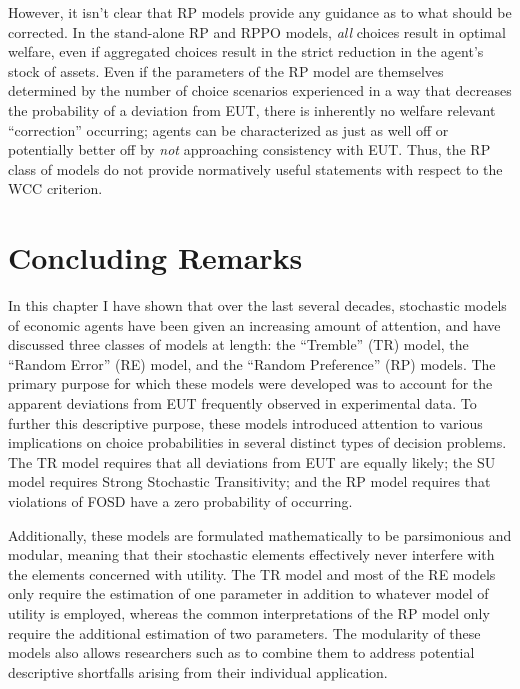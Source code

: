 \documentclass[../main.tex]{subfiles}
\begin{document}
However, it isn't clear that RP models provide any guidance as to what should be corrected.
In the stand-alone RP and RPPO models, \textit{all} choices result in optimal welfare, even if aggregated choices result in the strict reduction in the agent's stock of assets.
Even if the parameters of the RP model are themselves determined by the number of choice scenarios experienced in a way that decreases the probability of a deviation from EUT, there is inherently no welfare relevant \enquote{correction} occurring;
agents can be characterized as just as well off or potentially better off by \textit{not} approaching consistency with EUT.
Thus, the RP class of models do not provide normatively useful statements with respect to the WCC criterion.

\section{Concluding Remarks}

In this chapter I have shown that over the last several decades, stochastic models of economic agents have been given an increasing amount of attention, and have discussed three classes of models at length: the \enquote{Tremble} (TR) model, the \enquote{Random Error} (RE) model, and the \enquote{Random Preference} (RP) models.
The primary purpose for which these models were developed was to account for the apparent deviations from EUT frequently observed in experimental data.
To further this descriptive purpose, these models introduced attention to various implications on choice probabilities in several distinct types of decision problems.
The TR model requires that all deviations from EUT are equally likely;
the SU model requires Strong Stochastic Transitivity;
and the RP model requires that violations of FOSD have a zero probability of occurring.

Additionally, these models are formulated mathematically to be parsimonious and modular, meaning that their stochastic elements effectively never interfere with the elements concerned with utility.
The TR model and most of the RE models only require the estimation of one parameter in addition to whatever model of utility is employed, whereas the common interpretations of the RP model only require the additional estimation of two parameters.
The modularity of these models also allows researchers such as \textcite{Loomes2002} to combine them to address potential descriptive shortfalls arising from their individual application.
\end{document}
